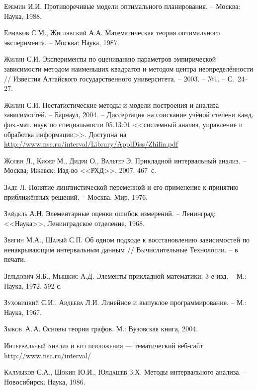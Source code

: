 \documentclass[a5paper,openany]{book}
\begin{document}
\begin{thebibliography}{999}
\textsc{Еремин И.И.} Противоречивые модели оптимального планирования. -- Москва: Наука, 
1988. 
  
\textsc{Ермаков С.М., Жиглявский А.А.} Математическая теория оптимального эксперимента. 
-- Москва: Наука, 1987. 
  
\textsc{Жилин С.И.} Эксперименты по оцениванию параметров эмпирической зависимости 
методом наименьших квадратов и методом центра неопределённости  //  Известия Алтайского 
государственного университета. -- 2003. -- №1. -- С.~24--27. 
  
\textsc{Жилин С.И.} Нестатистические методы и модели построения и анализа зависимостей. 
-- Барнаул, 2004. -- Диссертация на соискание учёной степени канд. физ.-мат. наук 
по специальности 05.13.01 <<системный анализ, управление и обработка информации>>. 
Доступна на \url{http://www.nsc.ru/interval/Library/ApplDiss/Zhilin.pdf} 
  
\textsc{Жолен Л., Кифер М., Дидри О., Вальтер Э.} Прикладной интервальный анализ. 
-- Москва; Ижевск: Изд-во <<РХД>>, 2007. 467~с.
  
\textsc{Заде Л.} Понятие лингвистической переменной и его применение к принятию 
приближённых решений. -- Москва: Мир, 1976. 
  
\textsc{Зайдель А.Н.} Элементарные оценки ошибок измерений. -- Ленинград: <<Наука>>, 
Ленинградское отделение, 1968.  
  
\textsc{Звягин М.А., Шарый С.П.} Об одном подходе к восстановлению зависимостей 
по ненакрывающим интервальным данным // Вычислительные Технологии. -- в печати.  
  
\textsc{Зельдович Я.Б., Мышкис А.Д.} Элементы прикладной математики. 3-е изд. 
-- М.: Наука, 1972. 592 с. 
  
\textsc{Зуховицкий С.И., Авдеева Л.И.} Линейное и выпуклое программирование. 
-- М.: Наука, 1967. 
  
\textsc{Зыков~А.\,А.} Основы теории графов. М.: Вузовская книга, 2004.
  
\textsc{Интервальный анализ и его приложения} --- тематический веб-сайт 
\url{http://www.nsc.ru/interval/}
  
\textsc{Калмыков С.А., Шокин Ю.И., Юлдашев З.Х.} Методы интервального анализа. 
-- Новосибирск: Наука, 1986. 
  

\end{thebibliography}
\end{document}
